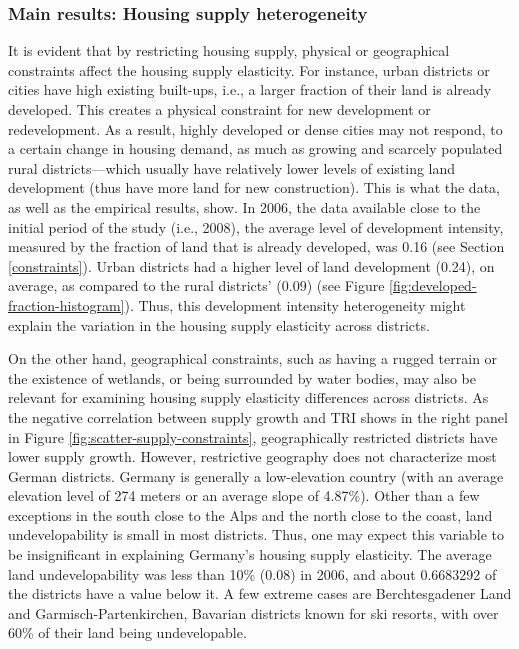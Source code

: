 \documentclass[
  12pt,
]{article}
\begin{document}
\subsubsection{Main results: Housing supply heterogeneity}\label{district-heterogeneity}

It is evident that by restricting housing supply, physical or geographical constraints affect the housing supply elasticity. For instance, urban districts or cities have high existing built-ups, i.e., a larger fraction of their land is already developed. This creates a physical constraint for new development or redevelopment. As a result, highly developed or dense cities may not respond, to a certain change in housing demand, as much as growing and scarcely populated rural districts---which usually have relatively lower levels of existing land development (thus have more land for new construction). This is what the data, as well as the empirical results, show. In 2006, the data available close to the initial period of the study (i.e., 2008), the average level of development intensity, measured by the fraction of land that is already developed, was 0.16 (see Section \ref{constraints}). Urban districts had a higher level of land development (0.24), on average, as compared to the rural districts' (0.09) (see Figure \ref{fig:developed-fraction-histogram}). Thus, this development intensity heterogeneity might explain the variation in the housing supply elasticity across districts.

On the other hand, geographical constraints, such as having a rugged terrain or the existence of wetlands, or being surrounded by water bodies, may also be relevant for examining housing supply elasticity differences across districts. As the negative correlation between supply growth and TRI shows in the right panel in Figure \ref{fig:scatter-supply-constraints}, geographically restricted districts have lower supply growth. However, restrictive geography does not characterize most German districts. Germany is generally a low-elevation country (with an average elevation level of 274 meters or an average slope of 4.87\%). Other than a few exceptions in the south close to the Alps and the north close to the coast, land undevelopability is small in most districts. Thus, one may expect this variable to be insignificant in explaining Germany's housing supply elasticity. The average land undevelopability was less than 10\% (0.08) in 2006, and about 0.6683292 of the districts have a value below it. A few extreme cases are Berchtesgadener Land and Garmisch-Partenkirchen, Bavarian districts known for ski resorts, with over 60\% of their land being undevelopable.
\end{document}
